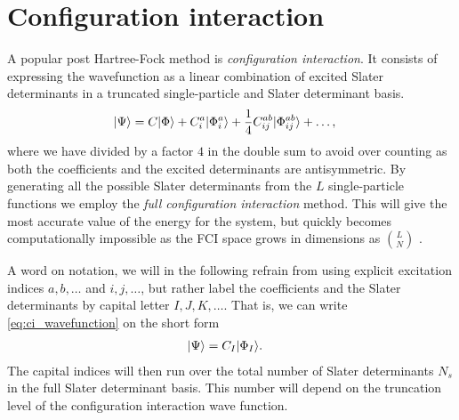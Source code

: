 \chapter{Configuration interaction}
     A popular post Hartree-Fock method is \textit{configuration interaction}.
     It consists of expressing the wavefunction as a linear combination of
     excited Slater determinants in a truncated single-particle and Slater
     determinant basis.
     \begin{align}
         | \Psi \rangle
         &= C| \Phi \rangle
         + C^a_i| \Phi^{a}_{i} \rangle
         + \frac{1}{4}C^{ab}_{ij}| \Phi^{ab}_{ij} \rangle
         + \dots,
         \label{eq:ci_wavefunction}
     \end{align}
     where we have divided by a factor $4$ in the double sum to avoid over
     counting as both the coefficients and the excited determinants are
     antisymmetric.
     By generating all the possible Slater determinants from the $L$
     single-particle functions we employ the \textit{full configuration
     interaction} method.
     This will give the most accurate value of the energy for the system, but
     quickly becomes computationally impossible as the FCI space grows in
     dimensions as $\binom{L}{N}$ \cite{kvaal2017notes}.

     A word on notation, we will in the following refrain from using explicit
     excitation indices $a, b, \dots$ and $i, j, \dots$, but rather label the
     coefficients and the Slater determinants by capital letter $I, J, K,
     \dots$.
     That is, we can write \autoref{eq:ci_wavefunction} on the short form
     \begin{align}
         | \Psi \rangle
         &= C_{I}| \Phi_I \rangle.
     \end{align}
     The capital indices will then run over the total number of Slater
     determinants $N_s$ in the full Slater determinant basis.
     This number will depend on the truncation level of the configuration
     interaction wave function.

